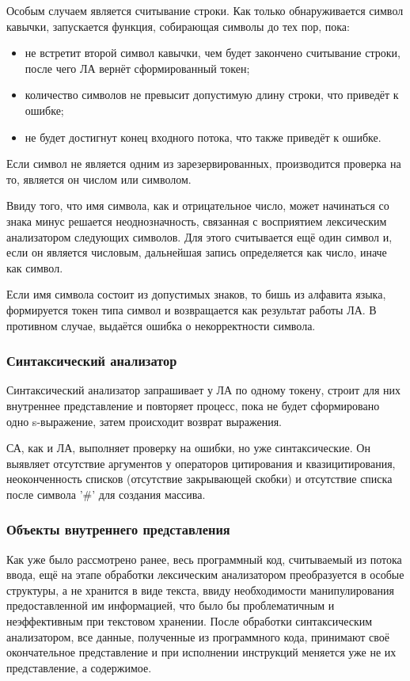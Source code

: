 Особым случаем является считывание строки. Как только обнаруживается символ кавычки, запускается функция, собирающая символы до тех пор, пока:
\begin{itemize}
	\item не встретит второй символ кавычки, чем будет закончено считывание строки, после чего ЛА вернёт сформированный токен;
	\item количество символов не превысит допустимую длину строки, что приведёт к ошибке;
	\item не будет достигнут конец входного потока, что также приведёт к ошибке.
\end{itemize}


Если символ не является одним из зарезервированных, производится проверка на то, является он числом или символом.

Ввиду того, что имя символа, как и отрицательное число, может начинаться со знака минус решается неоднозначность, связанная с восприятием лексическим анализатором следующих символов. Для этого считывается ещё один символ и, если он является числовым, дальнейшая запись определяется как число, иначе как символ.

Если имя символа состоит из допустимых знаков, то бишь из алфавита языка, формируется токен типа символ и возвращается как результат работы ЛА. В противном случае, выдаётся ошибка о некорректности символа.

\subsubsection{Синтаксический анализатор}
Синтаксический анализатор запрашивает у ЛА по одному токену, строит для них внутреннее представление и повторяет процесс, пока не будет сформировано одно s-выражение, затем происходит возврат выражения.

СА, как и ЛА, выполняет проверку на ошибки, но уже синтаксические. Он выявляет отсутствие аргументов у операторов цитирования и квазицитирования, неоконченность списков (отсутствие закрывающей скобки) и отсутствие списка после символа '\#' для создания массива.


\subsubsection{Объекты внутреннего представления}
Как уже было рассмотрено ранее, весь программный код, считываемый из потока ввода, ещё на этапе обработки лексическим анализатором преобразуется в особые структуры, а не хранится в виде текста, ввиду необходимости манипулирования предоставленной им информацией, что было бы проблематичным и неэффективным при текстовом хранении. После обработки синтаксическим анализатором, все данные, полученные из программного кода, принимают своё окончательное представление и при исполнении инструкций меняется уже не их представление, а содержимое.

